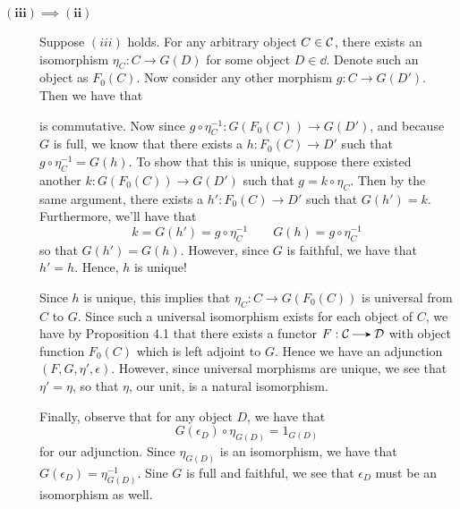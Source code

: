 \begin{prf}
\begin{description}
            \item[$\bm{(iii) \implies (ii)}$]
            Suppose $(iii)$ holds. For any  arbitrary object $C \in
            \mathcal{C}$, there exists an isomorphism $\eta_C: C \to G(D)$ for some
            object $D \in \dd$. Denote such an object as $F_0(C)$. 
            Now consider any other morphism $g: C
            \to G(D')$. Then we have that 
            \begin{center}
            \end{center}
            is commutative. Now since $g \circ \eta_C^{-1}: G(F_0(C)) \to
            G(D')$, and because $G$ is full, we know that there exists
            a $h: F_0(C) \to D'$ such that $g \circ \eta_C^{-1} = G(h)$. To show
            that this is unique, suppose there existed another $k:
            G(F_0(C)) \to G(D')$ such that $g = k \circ \eta_C$. Then by the
            same argument, there exists a $h': F_0(C) \to D'$ such that
            $G(h') = k$. Furthermore, we'll have that 
            \[
                k = G(h') = g \circ \eta_C^{-1} \qquad G(h) = g \circ \eta_C^{-1}
            \]
            so that $G(h') = G(h)$. However, since $G$ is faithful, we
            have that $h' = h$. Hence, $h$ is unique! 

            Since $h$ is unique, this implies that $\eta_C : C \to G(F_0(C))$ is
            universal from $C$ to $G$. Since such a universal
            isomorphism exists for each object of $C$, we have by
            Proposition 4.1 that there exists a functor $F: \cc \to
            \dd$ with object function $F_0(C)$ which is left adjoint
            to $G$. Hence we have an adjunction $(F, G, \eta',
            \epsilon)$. However, since universal morphisms are unique,
            we see that $\eta' = \eta$, so that $\eta$, our unit, is a
            natural isomorphism. 
            
            Finally, observe that for any object $D$, we have that 
            \[
                G(\epsilon_D) \circ \eta_{G(D)} = 1_{G(D)}
            \]
            for our adjunction. Since $\eta_{G(D)}$ is an isomorphism,
            we have that $G(\epsilon_D) = \eta_{G(D)}^{-1}$. Sine $G$
            is full and faithful, we see that $\epsilon_D$ must be an isomorphism as well. 
            

\end{description}
\end{prf}
